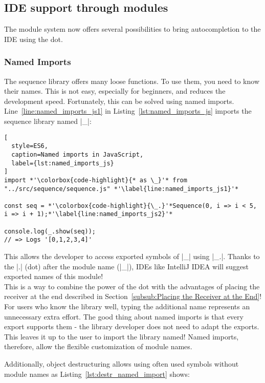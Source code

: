 \subsection{IDE support through modules} %
\label{sub:IDE support through modules}
The module system now offers several possibilities to bring autocompletion to
the IDE using the dot.
\subsubsection{Named Imports} %
\label{subsub:Named Imports}
The sequence library offers many loose functions. To use them, you need to know
their names. This is not easy, especially for beginners, and reduces the
development speed. Fortunately, this can be solved using named imports.
Line~\ref{line:named_imports_js1} in Listing~\ref{lst:named_imports_js} imports
the sequence library named |_|:

\begin{lstlisting}[
  style=ES6,
  caption=Named imports in JavaScript,
  label={lst:named_imports_js}
]
import *'\colorbox{code-highlight}{* as \_}'* from "../src/sequence/sequence.js" *'\label{line:named_imports_js1}'*

const seq = *'\colorbox{code-highlight}{\_.}'*Sequence(0, i => i < 5, i => i + 1);*'\label{line:named_imports_js2}'*

console.log(_.show(seq));
// => Logs '[0,1,2,3,4]'
\end{lstlisting}
This allows the developer to access exported symbols of |_| using |_.|. Thanks
to the |.| (dot) after the module name (|_|), IDEs like IntelliJ IDEA will
suggest exported names of this module!\\
This is a way to combine the power of the dot with the advantages of placing
the receiver at the end described in Section~\ref{subsub:Placing the Receiver
at the End}! \\
For users who know the library well, typing the additional name represents an
unnecessary extra effort. The good thing about named imports is that every
export supports them - the library developer does not need to adapt the
exports. \\
This leaves it up to the user to import the library named! Named
imports, therefore, allow the flexible customization of module names.

Additionally, object destructuring allows using often used symbols without
module names as Listing~\ref{lst:destr_named_import} shows:

